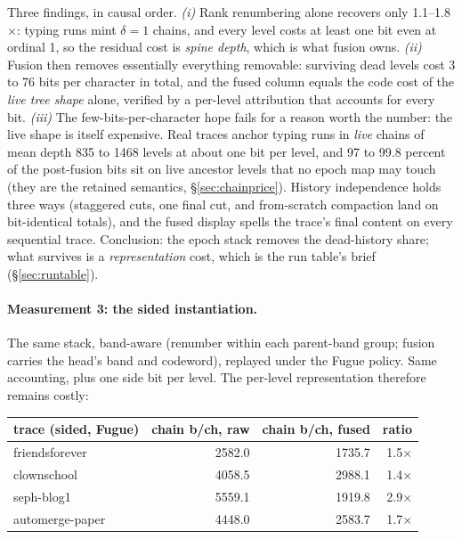 \documentclass[11pt]{article}
\begin{document}
\noindent Three findings, in causal order. \emph{(i)} Rank renumbering
alone recovers only 1.1--1.8$\times$: typing runs mint $\delta{=}1$
chains, and every level costs at least one bit even at ordinal 1, so
the residual cost is \emph{spine depth}, which is what fusion owns.
\emph{(ii)} Fusion then removes essentially everything removable:
surviving dead levels cost 3 to 76 bits per character in total, and the
fused column equals the code cost of the \emph{live tree shape} alone,
verified by a per-level attribution that accounts for every bit.
\emph{(iii)} The few-bits-per-character hope fails for a reason worth
the number: the live shape is itself expensive. Real traces anchor
typing runs in \emph{live} chains of mean depth 835 to 1468 levels at
about one bit per level, and 97 to 99.8 percent of the post-fusion bits
sit on live ancestor levels that no epoch map may touch (they are the
retained semantics, \S\ref{sec:chainprice}). History independence holds
three ways (staggered cuts, one final cut, and from-scratch compaction
land on bit-identical totals), and the fused display spells the trace's
final content on every sequential trace. Conclusion: the epoch stack
removes the dead-history share; what survives is a
\emph{representation} cost, which is the run table's brief
(\S\ref{sec:runtable}).

\paragraph{Measurement 3: the sided instantiation.} The same stack,
band-aware (renumber within each parent-band group; fusion carries the
head's band and codeword), replayed under the Fugue policy. Same
accounting, plus one side bit per level. The per-level representation
therefore remains costly:

\begin{center}\small
\begin{tabular}{@{}lrrr@{}}
\toprule
trace (sided, Fugue) & chain b/ch, raw & chain b/ch, fused & ratio \\
\midrule
friendsforever & 2582.0 & 1735.7 & 1.5$\times$ \\
clownschool & 4058.5 & 2988.1 & 1.4$\times$ \\
seph-blog1 & 5559.1 & 1919.8 & 2.9$\times$ \\
automerge-paper & 4448.0 & 2583.7 & 1.7$\times$ \\
\bottomrule
\end{tabular}
\end{center}
\end{document}
